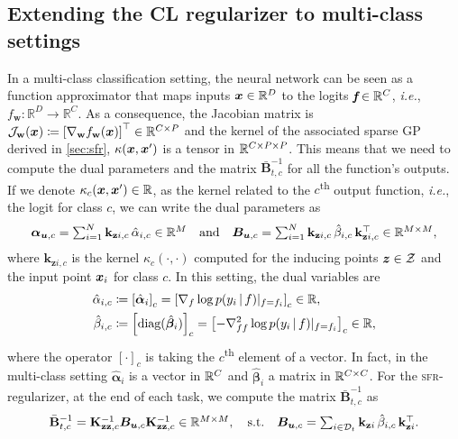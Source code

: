 \documentclass{article} %
\makeatletter
\newcommand{\ie}{\textit{i.e.\@}\xspace}
\newcommand{\our}{\textsc{sfr}\xspace}
\newcommand{\dataset}{\ensuremath{\mathcal{D}}}
\newcommand{\inputDomain}{\ensuremath{\mathbb{R}^{D}}}
\newcommand{\outputDomain}{\ensuremath{\mathbb{R}^{C}}}
\newcommand{\weights}{\ensuremath{\mathbf{w}}}
\newcommand{\mathbold}[1]{\bm{#1}}
\newcommand{\mbf}[1]{\mathbf{#1}}
\renewcommand{\mid}{\,|\,}
\newcommand{\MB}{\mbf{B}}
\newcommand{\T}{\top}
\newcommand{\valpha}[0]{\mathbold{\alpha}}
\newcommand{\vbeta}[0]{\mathbold{\beta}}
\newcommand{\MBeta}[0]{\mathbold{B}}
\newcommand{\Jac}[2]{\mathcal{J}_{#1}(#2)}
\newcommand{\MKzzc}{\mbf{K}_{\mbf{z}\mbf{z}, c}}
\newcommand{\vkzi}{\mbf{k}_{\mbf{z}i}}
\newcommand{\vkzic}{\mbf{k}_{\mbf{z}i,c}}
\makeatother
\begin{document}
\subsection{Extending the CL regularizer to multi-class settings}
\label{sec:cl_multioutput}
%
In a multi-class classification setting, the neural network can be seen as a function approximator that maps inputs $\vx \in \inputDomain$ to the logits $\textit{\textbf{f}} \in \outputDomain$, \ie, $f_\mathbf{w}: \inputDomain \to \outputDomain$. As a consequence, the Jacobian matrix is $\Jac{\weights}{\vx} \coloneqq \left[ \nabla_\weights f_\weights(\vx)\right]^\top \in \R^{C \times P}$ and the kernel of the associated sparse GP derived in \cref{sec:sfr}, $\kappa({\bm{x}}, {\bm{x}}')$ is a tensor in $\mathbb{R}^{C \times P \times P}$. This means that we need to compute the dual parameters and the matrix $\bar{\MB}^{-1}_{t, c}$ for all the function's outputs. If we denote $\kappa_c({\bm{x}}, {\bm{x}}') \in \mathbb{R}$, as the kernel related to the $c$\textsuperscript{th} output function, \ie, the logit for class $c$, we can write the dual parameters as
%
\begin{equation} \textstyle
  \valpha_{\vu, c}  =  \sum_{i=1}^N  \vkzic \, \hat{\alpha}_{i, c} \in \R^{M}
  \quad \text{and} \quad
  \MBeta_{\vu, c} =  \sum_{i=1}^N \vkzic \,\hat{\beta}_{i, c} \, \vkzic^{\T} \in \R^{M \times M} ,
\label{eq:app_dual_sparse}
\end{equation}
%
where $\vkzic$ is the kernel $\kappa_c(\cdot, \cdot)$ computed for the inducing points ${\bm{z}} \in \mathcal{Z}$ and the input point ${\bm{x}}_i$ for class $c$. In this setting, the dual variables are
\begin{equation}
\begin{aligned}
  \hat{\alpha}_{i,c} &\coloneqq  \left[\hat{\valpha}_{i}\right]_c = \left[\nabla_{f}\log p(y_i \mid f) |_{f=f_i} \right]_c \in \R,\\
  \hat{\beta}_{i,c} &\coloneqq \left[\textrm{diag}(\hat{\vbeta}_i)\right]_c = \left[ - \nabla^2_{ff}\log p(y_i \mid f) |_{f=f_i} \right]_c \in \R,
\end{aligned}
\end{equation}
where the operator $[ \cdot ]_c$ is taking the $c$\textsuperscript{th} element of a vector. In fact, in the multi-class setting $\hat{\valpha}_{i}$ is a vector in $\mathbb{R}^C$ and $\hat{\vbeta}_{i}$ a matrix in $\mathbb{R}^{C \times C}$.
For the \our-regularizer, at the end of each task, we compute the matrix $\bar{\MB}^{-1}_{t, c}$ as
\begin{equation}\textstyle
 	\bar{\MB}^{-1}_{t, c} = \MKzzc^{-1} \MBeta_{\vu, c} \MKzzc^{-1} \in \R^{M \times M},
 	\quad \text{s.t.} \quad
 	\MBeta_{\vu, c} =  \sum_{i \in \dataset_t} \vkzi \,\hat{\beta}_{i, c} \, \vkzi^{\T}.
\end{equation}
\end{document}
